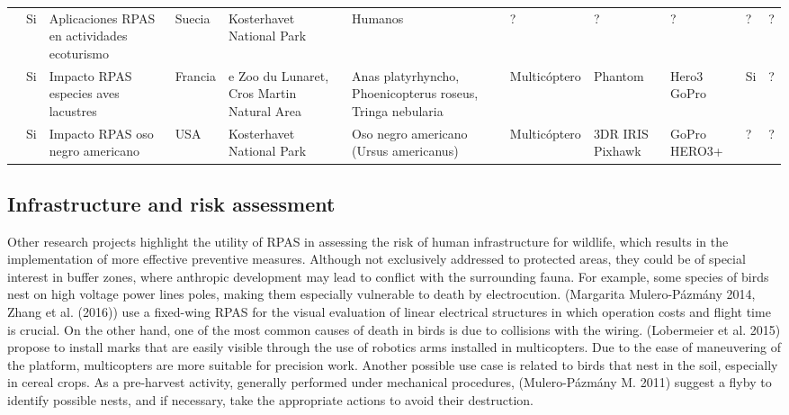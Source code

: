 \documentclass[]{interact}
\theoremstyle{plain}%
\theoremstyle{definition}
\theoremstyle{remark}
\begin{document}
\begin{landscape}
\begin{table}
\begin{tabular}{p{3cm}p{1.2cm}p{3cm}p{1cm}p{2cm}p{2cm}p{1cm}p{2cm}p{2cm}p{1cm}p{2cm}}
\cite{king_will_2014} & Si  & Aplicaciones RPAS en actividades ecoturismo & Suecia & Kosterhavet National Park &  Humanos  & ?  & ? & ?  & ? & ?  \\ 
  
\cite{vas_approaching_2015} & Si  & Impacto RPAS  especies aves lacustres  & Francia & e Zoo du Lunaret, Cros Martin Natural Area &  Anas platyrhyncho, Phoenicopterus roseus, Tringa nebularia  & Multicóptero &  Phantom & Hero3 GoPro & Si  & ?  \\ 

\cite{ditmer_bears_2015} & Si  & Impacto  RPAS oso negro americano   & USA & Kosterhavet National Park &  Oso negro americano (Ursus americanus) & Multicóptero & 3DR IRIS Pixhawk & GoPro HERO3+ & ?  & ?  \\ 



\end{tabular}

\end{table}
\end{landscape}

\subsection{Infrastructure and risk
assessment}\label{infrastructure-and-risk-assessment}

Other research projects highlight the utility of RPAS in assessing the
risk of human infrastructure for wildlife, which results in the
implementation of more effective preventive measures. Although not
exclusively addressed to protected areas, they could be of special
interest in buffer zones, where anthropic development may lead to
conflict with the surrounding fauna. For example, some species of birds
nest on high voltage power lines poles, making them especially
vulnerable to death by electrocution. (Margarita Mulero-Pázmány 2014,
Zhang et al. (2016)) use a fixed-wing RPAS for the visual evaluation of
linear electrical structures in which operation costs and flight time is
crucial. On the other hand, one of the most common causes of death in
birds is due to collisions with the wiring. (Lobermeier et al. 2015)
propose to install marks that are easily visible through the use of
robotics arms installed in multicopters. Due to the ease of maneuvering
of the platform, multicopters are more suitable for precision work.
Another possible use case is related to birds that nest in the soil,
especially in cereal crops. As a pre-harvest activity, generally
performed under mechanical procedures, (Mulero-Pázmány M. 2011) suggest
a flyby to identify possible nests, and if necessary, take the
appropriate actions to avoid their destruction.
\end{document}
